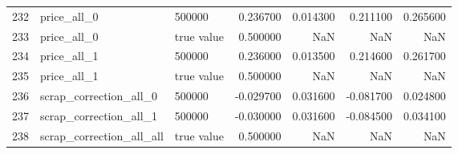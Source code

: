 \begin{tabular}{lllrrrr}
232 & price_all_0 & 500000 & 0.236700 & 0.014300 & 0.211100 & 0.265600 \\
233 & price_all_0 & true value & 0.500000 & NaN & NaN & NaN \\
234 & price_all_1 & 500000 & 0.236000 & 0.013500 & 0.214600 & 0.261700 \\
235 & price_all_1 & true value & 0.500000 & NaN & NaN & NaN \\
236 & scrap_correction_all_0 & 500000 & -0.029700 & 0.031600 & -0.081700 & 0.024800 \\
237 & scrap_correction_all_1 & 500000 & -0.030000 & 0.031600 & -0.084500 & 0.034100 \\
238 & scrap_correction_all_all & true value & 0.500000 & NaN & NaN & NaN \\
\bottomrule
\end{tabular}
